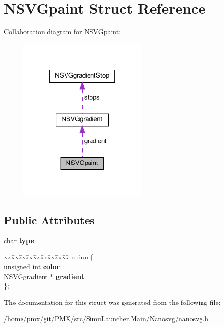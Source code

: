 \hypertarget{structNSVGpaint}{}\section{N\+S\+V\+Gpaint Struct Reference}
\label{structNSVGpaint}


Collaboration diagram for N\+S\+V\+Gpaint\+:
\nopagebreak
\begin{figure}[H]
\begin{center}
\leavevmode
\includegraphics[width=180pt]{structNSVGpaint__coll__graph}
\end{center}
\end{figure}
\subsection*{Public Attributes}
\begin{DoxyCompactItemize}
\item 
\mbox{\label{structNSVGpaint_a02ed7245e1a22db72952427801dbfa9f}} 
char {\bfseries type}
\item 
\mbox{\label{structNSVGpaint_a7287bb732dbb0859359c0e82df90b635}} 
\begin{tabbing}
xx\=xx\=xx\=xx\=xx\=xx\=xx\=xx\=xx\=\kill
union \{\\
\>unsigned int {\bfseries color}\\
\>\hyperlink{structNSVGgradient}{NSVGgradient} $\ast$ {\bfseries gradient}\\
\}; \\

\end{tabbing}\end{DoxyCompactItemize}


The documentation for this struct was generated from the following file\+:\begin{DoxyCompactItemize}
\item 
/home/pmx/git/\+P\+M\+X/src/\+Simu\+Launcher.\+Main/\+Nanosvg/nanosvg.\+h\end{DoxyCompactItemize}
